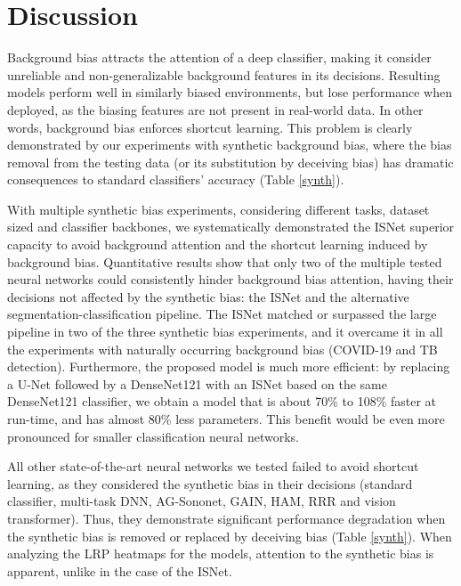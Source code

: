 \documentclass[fleqn,10pt]{wlscirep}
\begin{document}
{\section{Discussion}


Background bias attracts the attention of a deep classifier, making it consider unreliable and non-generalizable background features in its decisions. Resulting models perform well in similarly biased environments, but lose performance when deployed, as the biasing features are not present in real-world data. In other words, background bias enforces shortcut learning\cite{ShortcutLearning}. This problem is clearly demonstrated by our experiments with synthetic background bias, where the bias removal from the testing data (or its substitution by deceiving bias) has dramatic consequences to standard classifiers' accuracy (Table \ref{synth}).

With multiple synthetic bias experiments, considering different tasks, dataset sized and classifier backbones, we systematically demonstrated the ISNet superior capacity to avoid background attention and the shortcut learning induced by background bias. Quantitative results show that only two of the multiple tested neural networks could consistently hinder background bias attention, having their decisions not affected by the synthetic bias: the ISNet and the alternative segmentation-classification pipeline. The ISNet matched or surpassed the large pipeline in two of the three synthetic bias experiments, and it overcame it in all the experiments with naturally occurring background bias (COVID-19 and TB detection). Furthermore, the proposed model is much more efficient: by replacing a U-Net followed by a DenseNet121 with an ISNet based on the same DenseNet121 classifier, we obtain a model that is about 70\% to 108\% faster at run-time, and has almost 80\% less parameters. This benefit would be even more pronounced for smaller classification neural networks.

All other state-of-the-art neural networks we tested failed to avoid shortcut learning, as they considered the synthetic bias in their decisions (standard classifier, multi-task DNN, AG-Sononet, GAIN, HAM, RRR and vision transformer). Thus, they demonstrate significant performance degradation when the synthetic bias is removed or replaced by deceiving bias (Table \ref{synth}). When analyzing the LRP heatmaps for the models, attention to the synthetic bias is apparent, unlike in the case of the ISNet.

}
\end{document}
